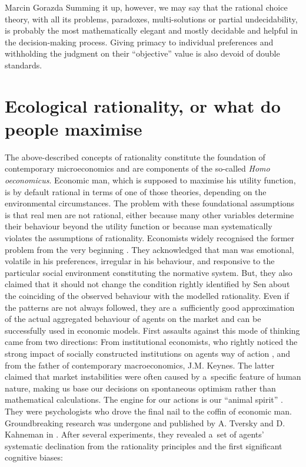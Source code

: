 \begin{artengenv}{Marcin Gorazda}
Summing it up, however, we may say that the rational choice theory, with all its problems, paradoxes, multi-solutions or partial undecidability, is probably the most mathematically elegant and mostly decidable and helpful in the decision-making process. Giving primacy to individual preferences and withholding the judgment on their ``objective'' value is also devoid of double standards.

\section*{Ecological rationality, or what do people maximise}
The above-described concepts of rationality constitute the foundation of contemporary microeconomics and are components of the so-called \textit{Homo oeconomicus}. Economic man, which is supposed to maximise his utility function, is by default rational in terms of one of those theories, depending on the environmental circumstances. The problem with these foundational assumptions is that real men are not rational, either because many other variables determine their behaviour beyond the utility function or because man systematically violates the assumptions of rationality. Economists widely recognised the former problem from the very beginning
\parencite[][]{hausman_definition_2007}. %
 They acknowledged that man was emotional, volatile in his preferences, irregular in his behaviour, and responsive to the particular social environment constituting the normative system. But, they also claimed that it should not change the condition rightly identified by Sen about the coinciding of the observed behaviour with the modelled rationality. Even if the patterns are not always followed, they are a~sufficiently good approximation of the actual aggregated behaviour of agents on the market and can be successfully used in economic models. First assaults against this mode of thinking came from two directions: From institutional economists, who rightly noticed the strong impact of socially constructed institutions on agents way of action 
\parencite[][]{veblen_why_1898}, %
 and from the father of contemporary macroeconomics, J.M. Keynes. The latter claimed that market instabilities were often caused by a~specific feature of human nature, making us base our decisions on spontaneous optimism rather than mathematical calculations. The engine for our actions is our ``animal spirit'' 
\parencite[][]{keynes_general_2009}. %
 They were psychologists who drove the final nail to the coffin of economic man. Groundbreaking research was undergone and published by A. Tversky and D. Kahneman in 
\parencite*[][]{kahneman_prospect_1979}. %
 After several experiments, they revealed a~set of agents' systematic declination from the rationality principles and the first significant cognitive biases:


\end{artengenv}
